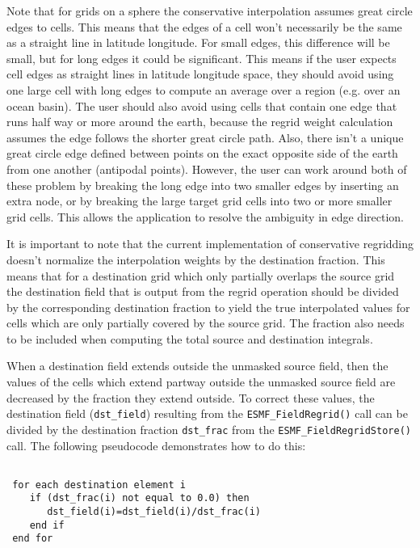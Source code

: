  Note that for grids on a sphere the conservative interpolation assumes great circle edges to cells. This means that the
 edges of a cell won't necessarily be
 the same as a straight line in latitude longitude. For small edges, this difference will be small, but for long edges it
 could be significant. This means if
 the user expects cell edges as straight lines in latitude longitude space, they should avoid using one large cell with 
 long edges to compute an average over a region (e.g. over an ocean basin). The 
 user should also avoid using cells that contain one edge that runs half way or more around the earth, because the 
 regrid weight calculation assumes the 
 edge follows the shorter great circle path. Also, there isn't a unique great circle edge defined between points on the 
 exact opposite side of the earth from one another (antipodal points). 
 However, the user can work around both of these problem by breaking the long edge into two smaller edges by inserting 
 an extra node, or by breaking the large target grid cells 
 into two or more smaller grid cells. This allows the application to resolve the ambiguity in edge direction. 

 It is important to note that the current implementation of conservative regridding doesn't normalize the interpolation 
 weights by the destination fraction. This means that for a destination
 grid which only partially overlaps the source grid the destination field that is output from the regrid operation 
 should be divided by the corresponding destination fraction to yield the 
 true interpolated values for cells which are only partially covered by the source grid. The fraction also needs to be 
 included when computing the total source and destination integrals. 

 When a destination field extends outside the unmasked source field, then the values of the cells which extend partway outside 
 the unmasked source field are decreased by the fraction they extend outside. To correct these values, the destination field ({\tt dst\_field}) resulting
 from the {\tt ESMF\_FieldRegrid()} call can be divided by the destination fraction {\tt dst\_frac} from
 the {\tt ESMF\_FieldRegridStore()} call. The following pseudocode demonstrates  how to do this:

\begin{verbatim}

 for each destination element i
    if (dst_frac(i) not equal to 0.0) then
       dst_field(i)=dst_field(i)/dst_frac(i)
    end if
 end for
\end{verbatim}

